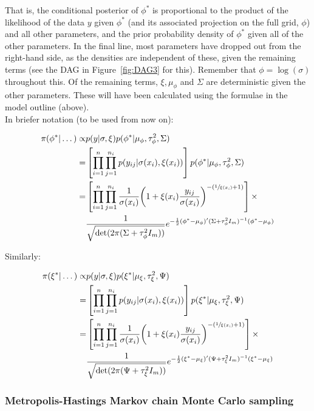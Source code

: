 \documentclass{article}
\begin{document}
That is, the conditional posterior of $\phi^*$ is proportional to the product of the likelihood of the data $y$ given $\phi^*$ (and its associated projection on the full grid, $\phi$) and all other parameters, and the prior probability density of $\phi^*$ given all of the other parameters. In the final line, most parameters have dropped out from the right-hand side, as the densities are independent of
these, given the remaining terms (see the DAG in Figure~\ref{fig:DAG3} for this). Remember that $\phi = \log(\sigma)$ throughout this. Of the remaining terms,  $\xi, \mu_\phi$ and $\Sigma$ are deterministic given the other parameters. These will have been calculated using the formulae in the model outline (above). \\

In briefer notation (to be used from now on):

\begin{align*}
\pi(\phi^* | \dots ) \propto & p(y | \sigma, \xi)  p(\phi^* | \mu_\phi, \tau^2_\phi, \Sigma) \\
= & \left[ \prod_{i=1}^n \prod_{j=1}^{n_i} p(y_{ij} | \sigma(x_i), \xi(x_i)) \right] p(\phi^* | \mu_\phi, \tau^2_\phi, \Sigma) \\
= & \left[ \prod_{i=1}^n \prod_{j=1}^{n_i} \frac{1}{\sigma(x_i)} \bigg( 1 + \xi(x_i) \frac{y_{ij}}{\sigma(x_i)} \bigg)^{-(\sfrac{1}{\xi(x_i)} + 1)} \right] \times \\
& \frac{1}{\sqrt{\det(2 \pi (\Sigma + \tau^2_\phi I_m))}} e^{-\frac{1}{2} (\phi^* - \mu_\phi)' (\Sigma + \tau^2_\phi I_m)^{-1} (\phi^* - \mu_\phi) }
\end{align*}

Similarly:

\begin{align*}
\pi(\xi^* | \dots ) \propto & p(y | \sigma, \xi)  p(\xi^* | \mu_\xi, \tau^2_\xi, \Psi) \\
= & \left[ \prod_{i=1}^n \prod_{j=1}^{n_i} p(y_{ij} | \sigma(x_i), \xi(x_i)) \right] p(\xi^* | \mu_\xi, \tau^2_\xi, \Psi) \\
= & \left[ \prod_{i=1}^n \prod_{j=1}^{n_i} \frac{1}{\sigma(x_i)} \bigg( 1 + \xi(x_i) \frac{y_{ij}}{\sigma(x_i)} \bigg)^{-(\sfrac{1}{\xi(x_i)} + 1)} \right] \times \\
& \frac{1}{\sqrt{\det(2 \pi (\Psi + \tau^2_\xi I_m))}} e^{-\frac{1}{2} (\xi^* - \mu_\xi)' (\Psi + \tau^2_\xi I_m)^{-1} (\xi^* - \mu_\xi) }
\end{align*}

\subsubsection*{Metropolis-Hastings Markov chain Monte Carlo sampling}
\end{document}
